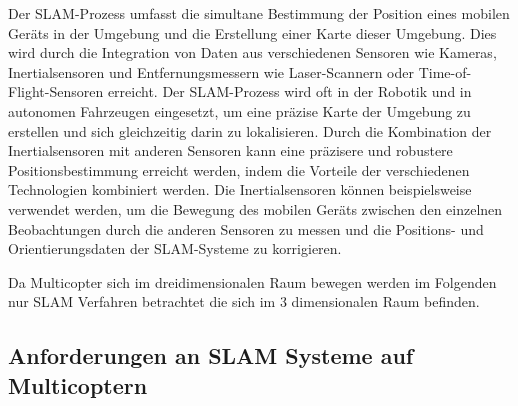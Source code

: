 Der SLAM-Prozess umfasst die simultane Bestimmung der Position eines mobilen Geräts in der Umgebung und die Erstellung einer Karte dieser Umgebung. Dies wird durch die Integration von Daten aus verschiedenen Sensoren wie Kameras, Inertialsensoren und Entfernungsmessern wie Laser-Scannern oder Time-of-Flight-Sensoren erreicht. Der SLAM-Prozess wird oft in der Robotik und in autonomen Fahrzeugen eingesetzt, um eine präzise Karte der Umgebung zu erstellen und sich gleichzeitig darin zu lokalisieren.
Durch die Kombination der Inertialsensoren mit anderen Sensoren kann eine präzisere und robustere Positionsbestimmung erreicht werden, indem die Vorteile der verschiedenen Technologien kombiniert werden. Die Inertialsensoren können beispielsweise verwendet werden, um die Bewegung des mobilen Geräts zwischen den einzelnen Beobachtungen durch die anderen Sensoren zu messen und die Positions- und Orientierungsdaten der SLAM-Systeme zu korrigieren.

Da Multicopter sich im dreidimensionalen Raum bewegen werden im Folgenden nur \ac{SLAM} Verfahren betrachtet die sich im 3 dimensionalen Raum befinden.

\subsection{Anforderungen an SLAM Systeme auf Multicoptern}

